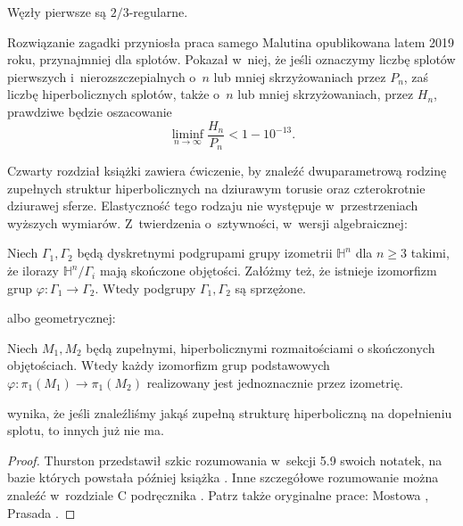 \begin{conjecture}
    \label{con:malyutin4}
    Węzły pierwsze są $2/3$-regularne.
\end{conjecture}

Rozwiązanie zagadki przyniosła praca samego Malutina \cite{malyutin19} opublikowana latem 2019 roku, przynajmniej dla splotów.
Pokazał w~niej, że jeśli oznaczymy liczbę splotów pierwszych i~nierozszczepialnych o~$n$ lub mniej skrzyżowaniach przez $P_n$, zaś liczbę hiperbolicznych splotów, także o~$n$ lub mniej skrzyżowaniach, przez $H_n$, prawdziwe będzie oszacowanie
\begin{equation}
    \liminf_{n \to \infty} \frac{H_n}{P_n} < 1 - 10^{-13}.
\end{equation}

Czwarty rozdział książki \cite{purcell2020} zawiera ćwiczenie, by znaleźć dwuparametrową rodzinę zupełnych struktur hiperbolicznych na dziurawym torusie oraz czterokrotnie dziurawej sferze.
Elastyczność tego rodzaju nie występuje w~przestrzeniach wyższych wymiarów.
Z~twierdzenia o~sztywności, w~wersji algebraicznej:

\begin{theorem}
    Niech $\Gamma_1, \Gamma_2$ będą dyskretnymi podgrupami grupy izometrii $\mathbb H^n$ dla $n \ge 3$ takimi, że ilorazy $\mathbb H^n/\Gamma_i$ mają skończone objętości.
    Załóżmy też, że istnieje izomorfizm grup $\varphi \colon \Gamma_1 \to \Gamma_2$.
    Wtedy podgrupy $\Gamma_1, \Gamma_2$ są sprzężone.
\end{theorem}

albo geometrycznej:

\begin{theorem}
    Niech $M_1, M_2$ będą zupełnymi, hiperbolicznymi rozmaitościami o skończonych objętościach.
    Wtedy każdy izomorfizm grup podstawowych $\varphi \colon \pi_1(M_1) \to \pi_1(M_2)$ realizowany jest jednoznacznie przez izometrię.
\end{theorem}

wynika, że jeśli znaleźliśmy jakąś zupełną strukturę hiperboliczną na dopełnieniu splotu, to innych już nie ma. 

\begin{proof}
    Thurston przedstawił szkic rozumowania w~sekcji 5.9 swoich notatek, na bazie których powstała później książka \cite{thurston97}.
    Inne szczegółowe rozumowanie można znaleźć w~rozdziale C podręcznika \cite{benedetti92}.
    Patrz także oryginalne prace: Mostowa \cite{mostow73}, Prasada \cite{prasad73}.
\end{proof}

